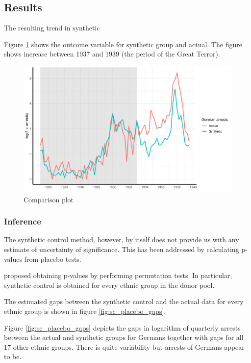 \subsection{Results}
The resulting trend in synthetic

Figure \ref{fig_sc_comp_plot} shows the outcome variable for synthetic group and actual. The figure shows increase between 1937 and 1939 (the period of the Great Terror).  
\begin{figure}[h]
\centering
\includegraphics[width=\textwidth]{plots/synthetic_control/until_pact/comparison_plot.pdf}
\caption{Comparison plot}
\label{fig_sc_comp_plot}
\end{figure}

\subsubsection{Inference}
The synthetic control method, however, by itself does not provide us with any estimate of uncertainty of significance. This has been addressed by calculating p-values from placebo tests. 

\citet{abadie_synthetic_2010} proposed obtaining p-values by performing permutation tests. In particular, synthetic control is obtained for every ethnic group in the donor pool. 

The estimated gaps between the synthetic control and the actual data for every ethnic group is shown in figure \ref{fig:sc_placebo_gaps}. 

Figure \ref{fig:sc_placebo_gaps} depicts the gaps in logarithm of quarterly arrests between the actual and synthetic groups for Germans together with gaps for all 17 other ethnic groups. There is quite variability but arrests of Germans appear to be. 

